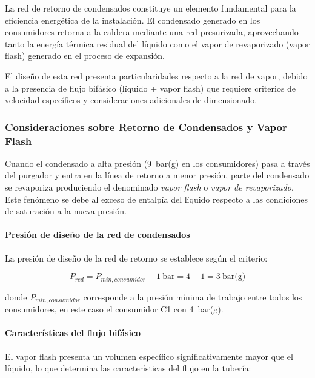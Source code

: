 \documentclass[12pt]{article}
\begin{document}
La red de retorno de condensados constituye un elemento fundamental para la eficiencia energética de la instalación. El condensado generado en los consumidores retorna a la caldera mediante una red presurizada, aprovechando tanto la energía térmica residual del líquido como el vapor de revaporizado (vapor flash) generado en el proceso de expansión.

El diseño de esta red presenta particularidades respecto a la red de vapor, debido a la presencia de flujo bifásico (líquido + vapor flash) que requiere criterios de velocidad específicos y consideraciones adicionales de dimensionado.

\subsubsection{Consideraciones sobre Retorno de Condensados y Vapor Flash}
\label{subsubsec:consideraciones-condensados}

Cuando el condensado a alta presión (9~bar(g) en los consumidores) pasa a través del purgador y entra en la línea de retorno a menor presión, parte del condensado se revaporiza produciendo el denominado \textit{vapor flash} o \textit{vapor de revaporizado}. Este fenómeno se debe al exceso de entalpía del líquido respecto a las condiciones de saturación a la nueva presión.

\paragraph{Presión de diseño de la red de condensados}

La presión de diseño de la red de retorno se establece según el criterio:

\begin{equation}
	P_{red} = P_{min,consumidor} - 1~\text{bar} = 4 - 1 = 3~\text{bar(g)}
	\label{eq:presion-red-condensados}
\end{equation}

donde $P_{min,consumidor}$ corresponde a la presión mínima de trabajo entre todos los consumidores, en este caso el consumidor C1 con 4~bar(g).

\paragraph{Características del flujo bifásico}

El vapor flash presenta un volumen específico significativamente mayor que el líquido, lo que determina las características del flujo en la tubería:
\end{document}
